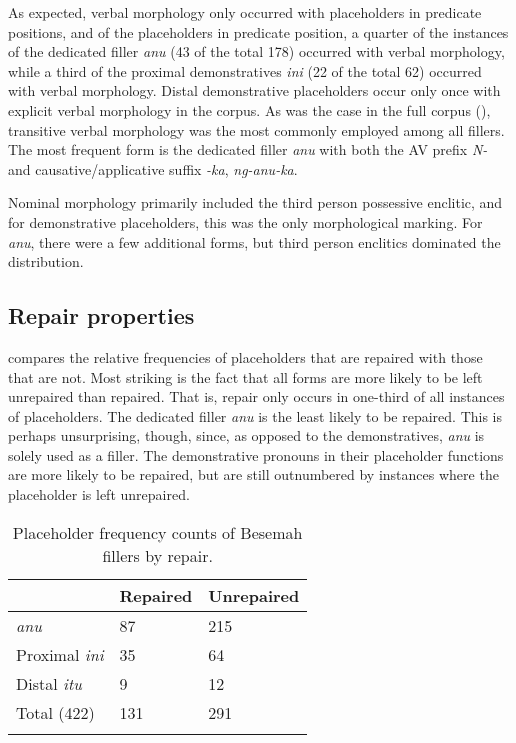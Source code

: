 \documentclass[output=paper,
\ChapterDOI{10.5281/zenodo.15697583}
colorlinks,
citecolor=brown]{langscibook}
\begin{document}
As expected, verbal morphology only occurred with placeholders in predicate positions, and of the placeholders in predicate position, a quarter of the instances of the dedicated filler \textit{anu} (43 of the total 178) occurred with verbal morphology, while a third of the proximal demonstratives \textit{ini} (22 of the total 62) occurred with verbal morphology. Distal demonstrative placeholders occur only once with explicit verbal morphology in the corpus. As was the case in the full corpus (), transitive verbal morphology was the most commonly employed among all fillers. The most frequent form is the dedicated filler \textit{anu} with both the AV prefix \textit{N-} and causative/applicative suffix \textit{-ka}, \textit{ng-anu-ka}.

Nominal morphology primarily included the third person possessive enclitic, and for demonstrative placeholders, this was the only morphological marking. For \textit{anu}, there were a few additional forms, but third person enclitics dominated the distribution.


\subsection{Repair properties}\label{sec:repair}
 compares the relative frequencies of placeholders that are repaired with those that are not. Most striking is the fact that all forms are more likely to be left unrepaired than repaired. That is, repair only occurs in one-third of all instances of placeholders. The dedicated filler \textit{anu} is the least likely to be repaired. This is perhaps unsurprising, though, since, as opposed to the demonstratives, \textit{anu} is solely used as a filler. The demonstrative pronouns in their placeholder functions are more likely to be repaired, but are still outnumbered by instances where the placeholder is left unrepaired.


\begin{table}
\caption{Placeholder frequency counts of Besemah fillers by repair.}
\label{table:place-repair}
\begin{tabularx}{.8\textwidth}{l YY}
\lsptoprule
&  {Repaired} &  {Unrepaired}\\
\midrule
\textit{anu} & 87 & 215 \\ 
Proximal \textit{ini} & 35 & 64 \\
Distal \textit{itu} & 9 & 12 \\
\midrule
Total (422) & 131 & 291 \\
\lspbottomrule
\end{tabularx}
\end{table}
\end{document}
